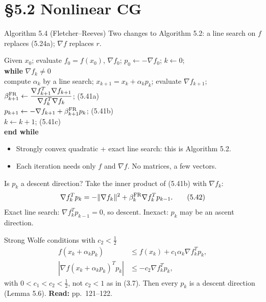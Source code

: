 \documentclass[12pt,aspectratio=169]{beamer}
\newcommand{\readpp}[1]{{\color{red!80!black}\textbf{Read:} #1}}
\newcommand{\algblock}[1]{\begin{block}{}#1\end{block}}
\newcommand{\kw}[1]{\textbf{#1}}
\newcommand{\ind}{\hspace*{1.2em}}
\begin{document}
\section{\S5.2 Nonlinear CG}

\begin{frame}{Algorithm 5.4 (Fletcher--Reeves)}
  Two changes to Algorithm 5.2: a line search on $f$ replaces (5.24a); $\nabla f$ replaces $r$.
  \algblock{
    Given $x_0$; evaluate $f_0=f(x_0)$, $\nabla f_0$; $p_0\leftarrow-\nabla f_0$; $k\leftarrow0$;\\
    \kw{while} $\nabla f_k\neq0$\\
    \ind compute $\alpha_k$ by a line search; $x_{k+1}=x_k+\alpha_kp_k$; evaluate $\nabla f_{k+1}$;\\
    \ind $\beta_{k+1}^{\rm FR}\leftarrow\dfrac{\nabla f_{k+1}^T\nabla f_{k+1}}{\nabla f_k^T\nabla f_k}$; \hfill (5.41a)\\[1ex]
    \ind $p_{k+1}\leftarrow-\nabla f_{k+1}+\beta_{k+1}^{\rm FR}p_k$; \hfill (5.41b)\\
    \ind $k\leftarrow k+1$; \hfill (5.41c)\\
    \kw{end while}
  }
  \begin{itemize}
    \item Strongly convex quadratic + exact line search: this is Algorithm 5.2.
    \item Each iteration needs only $f$ and $\nabla f$. No matrices, a few vectors.
  \end{itemize}
\end{frame}

\begin{frame}{Is $p_k$ a descent direction?}
  Take the inner product of (5.41b) with $\nabla f_k$:
  \begin{equation}
    \nabla f_k^Tp_k = -\|\nabla f_k\|^2+\beta_k^{\rm FR}\nabla f_k^Tp_{k-1}. \tag{5.42}
  \end{equation}
  Exact line search: $\nabla f_k^Tp_{k-1}=0$, so descent. Inexact: $p_k$ may be an \alert{ascent direction}.
  \begin{block}{Strong Wolfe conditions with $c_2<\frac12$}
    \vspace{-3ex}
    \begin{align}
      f(x_k+\alpha_kp_k) &\le f(x_k)+c_1\alpha_k\nabla f_k^Tp_k, \tag{5.43a}\\
      |\nabla f(x_k+\alpha_kp_k)^Tp_k| &\le -c_2\nabla f_k^Tp_k, \tag{5.43b}
    \end{align}
    with $0<c_1<c_2<\tfrac12$, not $c_2<1$ as in (3.7). Then every $p_k$ is a descent direction (Lemma 5.6).
    \hfill\readpp{pp.~121--122.}
  \end{block}
\end{frame}
\end{document}
